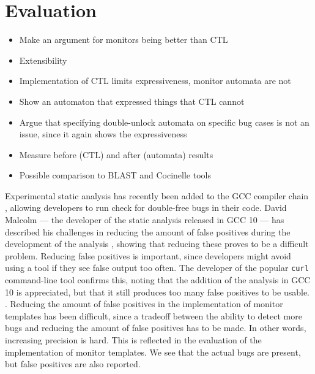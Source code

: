 \section{Evaluation}

\begin{itemize}
    \item Make an argument for monitors being better than CTL 
    \item Extensibility
    
    \setlength\itemindent{15pt} 
    \item Implementation of CTL limits expressiveness, monitor automata are not
    \item Show an automaton that expressed things that CTL cannot
    \item Argue that specifying double-unlock automata on specific bug cases is not an issue, since it again shows the expressiveness 
    \setlength\itemindent{0pt}
    
    \item Measure before (CTL) and after (automata) results
    \item Possible comparison to BLAST and Cocinelle tools
\end{itemize}

\noindent Experimental static analysis has recently been added to the GCC compiler chain \cite{gcc10}, allowing developers to run check for double-free bugs in their code. David Malcolm --- the developer of the static analysis released in GCC 10 --- has described his challenges in reducing the amount of false positives during the development of the analysis \cite{gcc10-development}, showing that reducing these proves to be a difficult problem. Reducing false positives is important, since developers might avoid using a tool if they see false output too often. The developer of the popular \texttt{curl} command-line tool confirms this, noting that the addition of the analysis in GCC 10 is appreciated, but that it still produces too many false positives to be usable. \cite{curl-static-analysis}. Reducing the amount of false positives in the implementation of monitor templates has been difficult, since a tradeoff between the ability to detect more bugs and reducing the amount of false positives has to be made. In other words, increasing precision is hard. This is reflected in the evaluation of the implementation of monitor templates. We see that the actual bugs are present, but false positives are also reported. 


